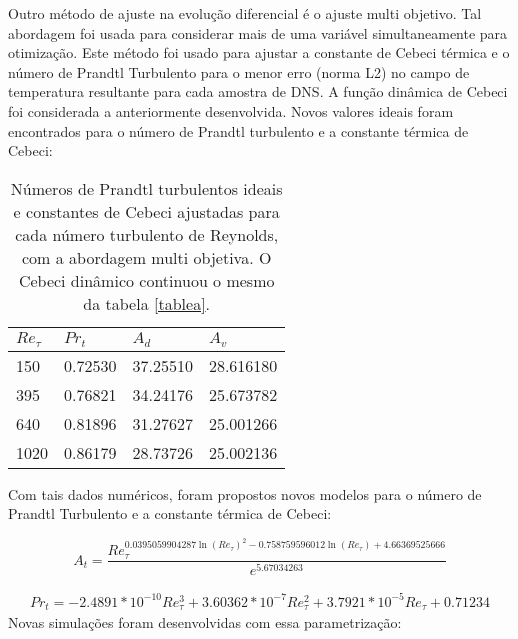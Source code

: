 Outro método de ajuste na evolução diferencial é o ajuste multi objetivo. Tal abordagem foi usada para considerar mais de uma variável simultaneamente para otimização. Este método foi usado para ajustar a constante de Cebeci térmica e o número de Prandtl Turbulento para o menor erro (norma L2) no campo de temperatura resultante para cada amostra de DNS. A função dinâmica de Cebeci foi considerada a anteriormente desenvolvida. Novos valores ideais foram encontrados para o número de Prandtl turbulento e a constante térmica de Cebeci:

\begin{table}[!h]
	\centering
	\caption{Números de Prandtl turbulentos ideais e constantes de Cebeci ajustadas para cada número turbulento de Reynolds, com a abordagem multi objetiva. O Cebeci dinâmico continuou o mesmo da tabela \ref{tablea}. }
	\begin{tabular}{llll}
		\hline
		$Re_\tau$ & $Pr_t$ & $A_d$ & $A_v$\\
		\hline
		150  &   0.72530 & 37.25510 & 28.616180\\
		395  &   0.76821 & 34.24176 & 25.673782\\
		640  &   0.81896 & 31.27627 & 25.001266\\
		1020 &   0.86179 & 28.73726 & 25.002136\\ 
		\hline
	\end{tabular}
\end{table}
Com tais dados numéricos, foram propostos novos modelos para o número de Prandtl Turbulento e a constante térmica de Cebeci:

\begin{equation}
A_t = \frac{Re_\tau ^{0.0395059904287 \ln(Re_\tau)^2 - 0.758759596012 \ln(Re_\tau) +  4.66369525666  } }{e ^{5.67034263}}
\end{equation}

\begin{equation}
\begin{split}
Pr_t = -2.4891 * 10^{-10} Re_\tau^3 +  3.60362 * 10^{-7} Re_\tau^2 + 3.7921 *10 ^{-5} Re_\tau + 0.71234 
\end{split}
\end{equation}
Novas simulações foram desenvolvidas com essa parametrização:

